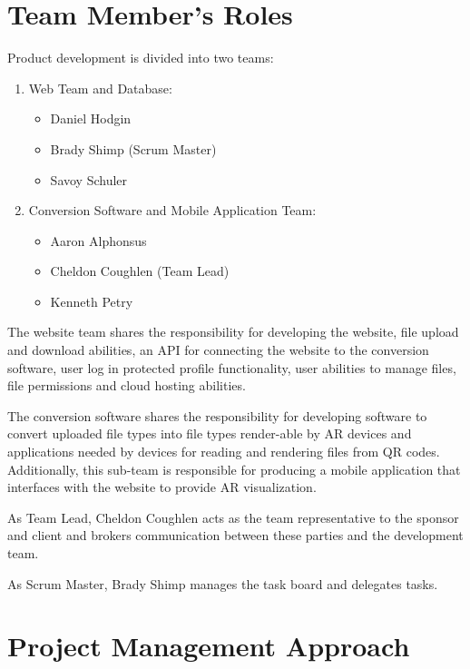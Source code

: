 
\section{Team Member's Roles}

Product development is divided into two teams:
\begin{enumerate}
    \item Web Team and Database:
        \begin{itemize}
            \item Daniel Hodgin
            \item Brady Shimp (Scrum Master)
            \item Savoy Schuler
        \end{itemize}
    \item Conversion Software and Mobile Application Team:
        \begin{itemize}
            \item Aaron Alphonsus
            \item Cheldon Coughlen (Team Lead)
            \item Kenneth Petry
        \end{itemize}
\end{enumerate}

The website team shares the responsibility for developing the website, file upload and download abilities, an API for connecting the website to the conversion software, user log in protected profile functionality, user abilities to manage files, file permissions and cloud hosting abilities.  


The conversion software shares the responsibility for developing software to convert uploaded file types into file types render-able by AR devices and applications needed by devices for reading and rendering files from QR codes.  Additionally,  this sub-team is responsible for producing a mobile application that interfaces with the website to provide AR visualization.


As Team Lead, Cheldon Coughlen acts as the team representative to the sponsor and client and brokers communication between these parties and the development team. 

As Scrum Master, Brady Shimp manages the task board and delegates tasks. 

\section{Project Management Approach}

